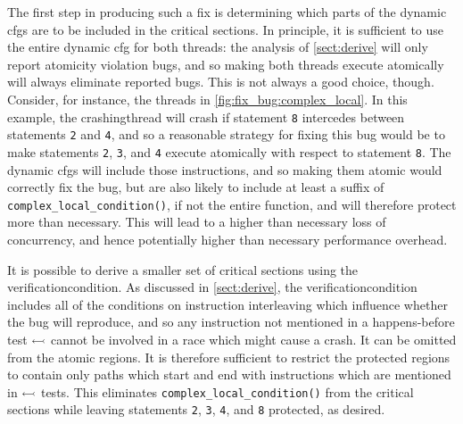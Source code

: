 The first step in producing such a fix is determining which parts of
the dynamic \glspl{cfg} are to be included in the critical sections.
In principle, it is sufficient to use the entire dynamic \gls{cfg} for
both threads: the analysis of \autoref{sect:derive} will only report
atomicity violation bugs, and so making both threads execute
atomically will always eliminate reported bugs.  This is not always a
good choice, though.  Consider, for instance, the threads in
\autoref{fig:fix_bug:complex_local}.  In this example, the
\gls{crashingthread} will crash if statement \texttt{8} intercedes
between statements \texttt{2} and \texttt{4}, and so a reasonable
strategy for fixing this bug would be to make statements \texttt{2},
\texttt{3}, and \texttt{4} execute atomically with respect to
statement \texttt{8}.  The dynamic \glspl{cfg} will include those
instructions, and so making them atomic would correctly fix the bug,
but are also likely to include at least a suffix of
\texttt{complex\_local\_condition()}, if not the entire function,
and will therefore protect more than necessary. This will lead to a
higher than necessary loss of concurrency, and hence potentially
higher than necessary performance overhead.


It is possible to derive a smaller set of critical sections using the
\gls{verificationcondition}.  As discussed in \autoref{sect:derive},
the \gls{verificationcondition} includes all of the conditions on
instruction interleaving which influence whether the bug will
reproduce, and so any instruction not mentioned in a happens-before
test $\leftarrowtail$ cannot be involved in a race which might
cause a crash.  It can be omitted from the atomic regions.  It is
therefore sufficient to restrict the protected regions to contain only
paths which start and end with instructions which are mentioned in
$\leftarrowtail$ tests.  This eliminates
\texttt{complex\_local\_condition()} from the critical sections
while leaving statements \texttt{2}, \texttt{3}, \texttt{4}, and
\texttt{8} protected, as desired.


